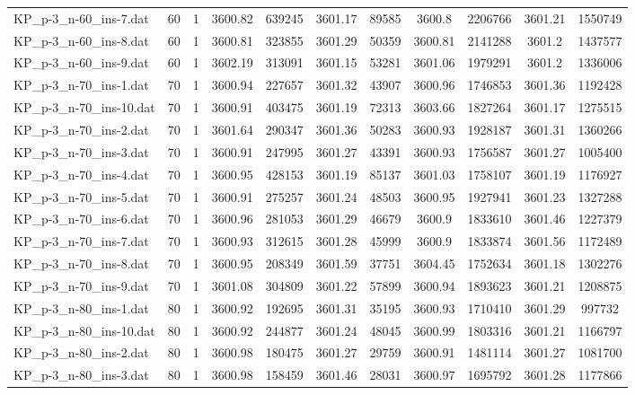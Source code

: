 \begin{table}[!ht]
\begin{tabular}{lcccccccccc}
KP\_p-3\_n-60\_ins-7.dat & 60 & 1 & 3600.82 & 639245 & 3601.17 & 89585 & 3600.8 & 2206766 & 3601.21 & 1550749 \\
KP\_p-3\_n-60\_ins-8.dat & 60 & 1 & 3600.81 & 323855 & 3601.29 & 50359 & 3600.81 & 2141288 & 3601.2 & 1437577 \\
KP\_p-3\_n-60\_ins-9.dat & 60 & 1 & 3602.19 & 313091 & 3601.15 & 53281 & 3601.06 & 1979291 & 3601.2 & 1336006 \\
KP\_p-3\_n-70\_ins-1.dat & 70 & 1 & 3600.94 & 227657 & 3601.32 & 43907 & 3600.96 & 1746853 & 3601.36 & 1192428 \\
KP\_p-3\_n-70\_ins-10.dat & 70 & 1 & 3600.91 & 403475 & 3601.19 & 72313 & 3603.66 & 1827264 & 3601.17 & 1275515 \\
KP\_p-3\_n-70\_ins-2.dat & 70 & 1 & 3601.64 & 290347 & 3601.36 & 50283 & 3600.93 & 1928187 & 3601.31 & 1360266 \\
KP\_p-3\_n-70\_ins-3.dat & 70 & 1 & 3600.91 & 247995 & 3601.27 & 43391 & 3600.93 & 1756587 & 3601.27 & 1005400 \\
KP\_p-3\_n-70\_ins-4.dat & 70 & 1 & 3600.95 & 428153 & 3601.19 & 85137 & 3601.03 & 1758107 & 3601.19 & 1176927 \\
KP\_p-3\_n-70\_ins-5.dat & 70 & 1 & 3600.91 & 275257 & 3601.24 & 48503 & 3600.95 & 1927941 & 3601.23 & 1327288 \\
KP\_p-3\_n-70\_ins-6.dat & 70 & 1 & 3600.96 & 281053 & 3601.29 & 46679 & 3600.9 & 1833610 & 3601.46 & 1227379 \\
KP\_p-3\_n-70\_ins-7.dat & 70 & 1 & 3600.93 & 312615 & 3601.28 & 45999 & 3600.9 & 1833874 & 3601.56 & 1172489 \\
KP\_p-3\_n-70\_ins-8.dat & 70 & 1 & 3600.95 & 208349 & 3601.59 & 37751 & 3604.45 & 1752634 & 3601.18 & 1302276 \\
KP\_p-3\_n-70\_ins-9.dat & 70 & 1 & 3601.08 & 304809 & 3601.22 & 57899 & 3600.94 & 1893623 & 3601.21 & 1208875 \\
KP\_p-3\_n-80\_ins-1.dat & 80 & 1 & 3600.92 & 192695 & 3601.31 & 35195 & 3600.93 & 1710410 & 3601.29 & 997732 \\
KP\_p-3\_n-80\_ins-10.dat & 80 & 1 & 3600.92 & 244877 & 3601.24 & 48045 & 3600.99 & 1803316 & 3601.21 & 1166797 \\
KP\_p-3\_n-80\_ins-2.dat & 80 & 1 & 3600.98 & 180475 & 3601.27 & 29759 & 3600.91 & 1481114 & 3601.27 & 1081700 \\
KP\_p-3\_n-80\_ins-3.dat & 80 & 1 & 3600.98 & 158459 & 3601.46 & 28031 & 3600.97 & 1695792 & 3601.28 & 1177866 \\

\end{tabular}
\end{table}
